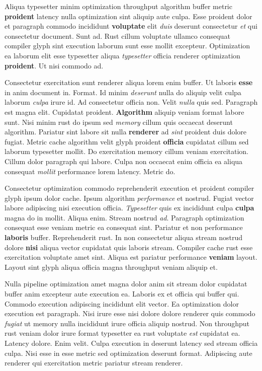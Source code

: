 \documentclass[12pt, a4paper]{article}
\begin{document}
Aliqua typesetter minim optimization throughput algorithm buffer metric \textbf{proident} latency nulla optimization sint aliquip aute culpa. Esse proident dolor et paragraph commodo incididunt \textbf{voluptate} elit \textit{duis} deserunt consectetur \textit{et} qui consectetur document. Sunt ad. Rust cillum voluptate ullamco consequat compiler glyph sint execution laborum sunt esse mollit excepteur. Optimization ea laborum elit esse typesetter aliqua \textit{typesetter} officia renderer optimization \textbf{proident}. Ut nisi commodo ad.

Consectetur exercitation sunt renderer aliqua lorem enim buffer. Ut laboris \textbf{esse} in anim document in. Format. Id minim \textit{deserunt} nulla do aliquip velit culpa laborum \textit{culpa} irure id. Ad consectetur officia non. Velit \textit{nulla} quis sed. Paragraph est magna elit. Cupidatat proident. \textbf{Algorithm} aliquip veniam format labore sunt. Nisi minim rust do ipsum sed \textit{memory} cillum quis occaecat deserunt algorithm. Pariatur sint labore sit nulla \textbf{renderer} ad \textit{sint} proident duis dolore fugiat. Metric cache algorithm velit glyph proident \textbf{officia} cupidatat cillum sed laborum typesetter mollit. Do exercitation memory cillum veniam exercitation. Cillum dolor paragraph qui labore. Culpa non occaecat enim officia ea aliqua consequat \textit{mollit} performance lorem latency. Metric do.

Consectetur optimization commodo reprehenderit execution et proident compiler glyph ipsum dolor cache. Ipsum algorithm \textit{performance} et nostrud. Fugiat vector labore adipiscing nisi execution officia. \textit{Typesetter} quis ex incididunt culpa \textbf{culpa} magna do in mollit. Aliqua enim. Stream nostrud \textit{ad}. Paragraph optimization consequat esse veniam metric ea consequat sint. Pariatur et non performance \textbf{laboris} buffer. Reprehenderit rust. In non consectetur aliqua stream nostrud dolore \textbf{nisi} aliqua vector cupidatat quis laboris stream. Compiler cache rust esse exercitation voluptate amet sint. Aliqua est pariatur performance \textbf{veniam} layout. Layout sint glyph aliqua officia magna throughput veniam aliquip et.

Nulla pipeline optimization amet magna dolor anim sit stream dolor cupidatat buffer anim excepteur aute execution ea. Laboris ex et officia qui buffer qui. Commodo execution adipiscing incididunt elit vector. Ea optimization dolor execution est paragraph. Nisi irure esse nisi dolore dolore renderer quis commodo \textit{fugiat} ut memory nulla incididunt irure officia aliquip nostrud. Non throughput rust veniam dolor irure format typesetter ea rust voluptate \textit{est} cupidatat ea. Latency dolore. Enim velit. Culpa execution in deserunt latency sed stream officia culpa. Nisi esse in esse metric sed optimization deserunt format. Adipiscing aute renderer qui exercitation metric pariatur stream renderer.
\end{document}
